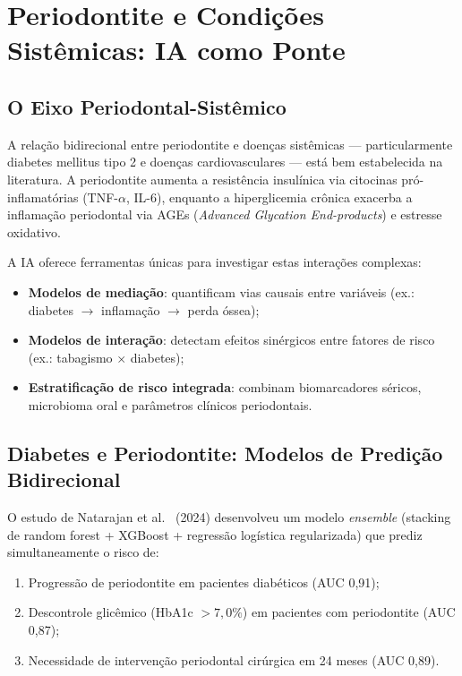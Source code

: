 
\section{Periodontite e Condições Sistêmicas: IA como Ponte}

\subsection{O Eixo Periodontal-Sistêmico}

A relação bidirecional entre periodontite e doenças sistêmicas --- particularmente diabetes mellitus tipo 2 e doenças cardiovasculares --- está bem estabelecida na literatura. A periodontite aumenta a resistência insulínica via citocinas pró-inflamatórias (TNF-$\alpha$, IL-6), enquanto a hiperglicemia crônica exacerba a inflamação periodontal via AGEs (\textit{Advanced Glycation End-products}) e estresse oxidativo.

A IA oferece ferramentas únicas para investigar estas interações complexas:
\begin{itemize}
    \item \textbf{Modelos de mediação}: quantificam vias causais entre variáveis (ex.: diabetes $\rightarrow$ inflamação $\rightarrow$ perda óssea);
    \item \textbf{Modelos de interação}: detectam efeitos sinérgicos entre fatores de risco (ex.: tabagismo $\times$ diabetes);
    \item \textbf{Estratificação de risco integrada}: combinam biomarcadores séricos, microbioma oral e parâmetros clínicos periodontais.
\end{itemize}

\subsection{Diabetes e Periodontite: Modelos de Predição Bidirecional}

O estudo de Natarajan et al.~\cite{natarajan2024} (2024) desenvolveu um modelo \textit{ensemble} (stacking de random forest + XGBoost + regressão logística regularizada) que prediz simultaneamente o risco de:
\begin{enumerate}
    \item Progressão de periodontite em pacientes diabéticos (AUC 0,91);
    \item Descontrole glicêmico (HbA1c $> 7,0\%$) em pacientes com periodontite (AUC 0,87);
    \item Necessidade de intervenção periodontal cirúrgica em 24 meses (AUC 0,89).
\end{enumerate}

